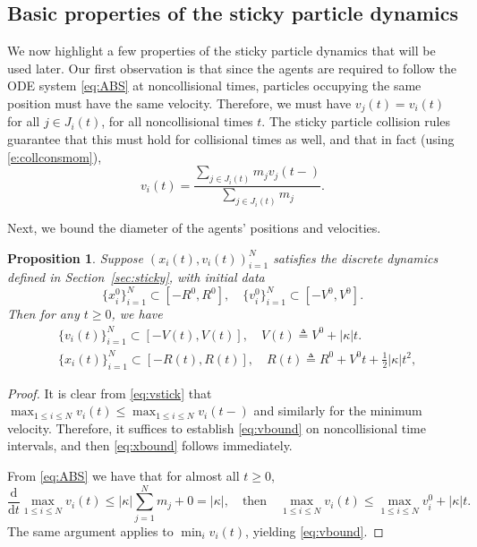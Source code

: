 \documentclass[10pt,a4paper]{amsart}
\newtheorem{proposition}[theorem]{Proposition}
\def\dd{\mathrm{d}}
\begin{document}
	\subsection{Basic properties of the sticky particle dynamics}
	
	\label{sec:stickyprops} We now highlight a few properties of the sticky particle dynamics that will be used later.  Our first observation is that since the agents are required to follow the ODE system \eqref{eq:ABS} at noncollisional times, particles occupying the same position must have the same velocity. Therefore, we must have $v_j(t) = v_i(t)$ for all $j\in J_i(t)$, for all noncollisional times $t$.  The sticky particle collision rules guarantee that this must hold for collisional times as well, and that in fact (using \eqref{e:collconsmom}),
	\begin{equation}
		\label{eq:vstick}
		v_i(t) = \frac{\sum_{j\in J_i(t)} m_j v_j(t-)}{\sum_{j\in J_i(t)} m_j}.
	\end{equation}
	
	Next, we bound the diameter of the agents' positions and velocities.
	\begin{proposition}\label{prop:xvbound}
		Suppose $(x_i(t),v_i(t))_{i=1}^N$ satisfies the discrete dynamics defined in Section~\ref{sec:sticky}, with initial data
		\[
		\{x_i^0\}_{i=1}^N\subset [-R^0,R^0],\quad \{v_i^0\}_{i=1}^N\subset [-V^0,V^0].
		\]
		Then for any $t\geq0$, we have
		\begin{align}
			& \{v_i(t)\}_{i=1}^N\subset [-V(t),V(t)],\quad V(t) \triangleq V^0 + |\kappa| t. \label{eq:vbound} \\
			& \{x_i(t)\}_{i=1}^N\subset [-R(t),R(t)],\quad R(t) \triangleq R^0 + V^0t +\tfrac12|\kappa| t^2,\label{eq:xbound}
		\end{align}
	\end{proposition}
	\begin{proof}
		It is clear from \eqref{eq:vstick} that $\max_{1\leq i\leq N} v_i(t) \le \max_{1\leq i\leq N} v_i(t-)$ and similarly for the minimum velocity.  Therefore, it suffices to establish \eqref{eq:vbound} on noncollisional time intervals, and then \eqref{eq:xbound} follows immediately.
		
		From \eqref{eq:ABS} we have that for almost all $t\geq0$, 
		\[
		\frac{\dd}{\dd t} \max_{1\leq i\leq N} v_i(t)\leq |\kappa| \sum_{j=1}^N m_j +0 = |\kappa|,\quad\text{then}\quad 
		\max_{1\leq i\leq N} v_i(t)\leq \max_{1\leq i\leq N} v_i^0+|\kappa| t.
		\]
		The same argument applies to $\min_i v_i(t)$, yielding \eqref{eq:vbound}.
	\end{proof}
	
\end{document}
